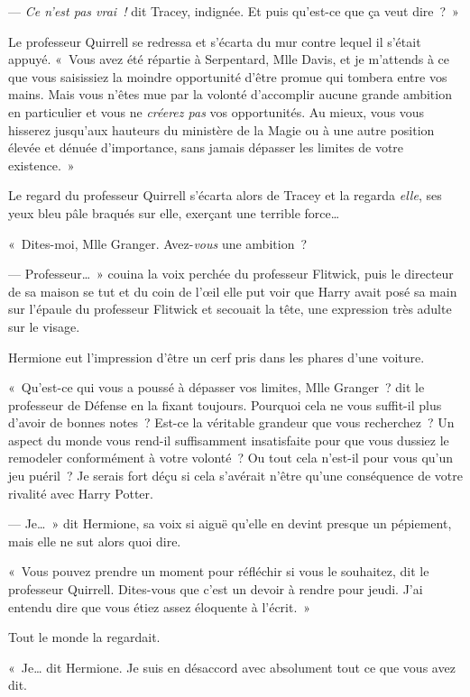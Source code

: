 --- \emph{Ce n'est pas vrai~!}  dit Tracey, indignée.
Et puis qu'est-ce que ça veut dire~?~»

Le professeur Quirrell se redressa et s'écarta du mur contre lequel il s'était appuyé.
«~Vous avez été répartie à Serpentard, Mlle Davis, et je m'attends à ce que vous saisissiez la moindre opportunité d'être promue qui tombera entre vos mains.
Mais vous n'êtes mue par la volonté d'accomplir aucune grande ambition en particulier et vous ne \emph{créerez pas} vos opportunités.
Au mieux, vous vous hisserez jusqu'aux hauteurs du ministère de la Magie ou à une autre position élevée et dénuée d'importance, sans jamais dépasser les limites de votre existence.~»

Le regard du professeur Quirrell s'écarta alors de Tracey et la regarda \emph{elle}, ses yeux bleu pâle braqués sur elle, exerçant une terrible force…

«~Dites-moi, Mlle Granger.
Avez-\emph{vous} une ambition~?

--- Professeur…~»
couina la voix perchée du professeur Flitwick, puis le directeur de sa maison se tut et du coin de l'œil elle put voir que Harry avait posé sa main sur l'épaule du professeur Flitwick et secouait la tête, une expression très adulte sur le visage.

Hermione eut l'impression d'être un cerf pris dans les phares d'une voiture.

«~Qu'est-ce qui vous a poussé à dépasser vos limites, Mlle Granger~? dit le professeur de Défense en la fixant toujours.
Pourquoi cela ne vous suffit-il plus d'avoir de bonnes notes~?
Est-ce la véritable grandeur que vous recherchez~?
Un aspect du monde vous rend-il suffisamment insatisfaite pour que vous dussiez le remodeler conformément à votre volonté~?
Ou tout cela n'est-il pour vous qu'un jeu puéril~?
Je serais fort déçu si cela s'avérait n'être qu'une conséquence de votre rivalité avec Harry Potter.

--- Je…~» dit Hermione, sa voix si aiguë qu'elle en devint presque un pépiement, mais elle ne sut alors quoi dire.

«~Vous pouvez prendre un moment pour réfléchir si vous le souhaitez, dit le professeur Quirrell.
Dites-vous que c'est un devoir à rendre pour jeudi.
J'ai entendu dire que vous étiez assez éloquente à l'écrit.~»

Tout le monde la regardait.

«~Je… dit Hermione.
Je suis en désaccord avec absolument tout ce que vous avez dit.

